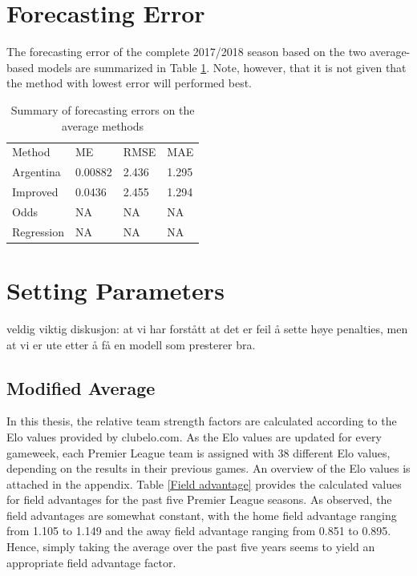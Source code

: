 \section{Forecasting Error}

The forecasting error of the complete 2017/2018 season based on the two average-based models are summarized in Table \ref{tab:accuracy_average}. Note, however, that it is not given that the method with lowest error will performed best. 

\begin{table}[H]
\centering
\caption{Summary of forecasting errors on the average methods}
\label{tab:accuracy_average}
\begin{tabular}{llll}
Method & ME & RMSE & MAE\\
Argentina & 0.00882 & 2.436 & 1.295 \\
Improved  & 0.0436  & 2.455 & 1.294 \\ 
Odds  & NA  & NA & NA   \\
Regression  & NA  & NA & NA \\
\end{tabular}
\end{table}

\section{Setting Parameters}
veldig viktig diskusjon: 
at vi har forstått at det er feil å sette høye penalties, men at vi er ute etter å få en modell som presterer bra. 


\subsection{Modified Average}
In this thesis, the relative team strength factors are calculated according to the Elo values provided by clubelo.com. As the Elo values are updated for every gameweek, each Premier League team is assigned with 38 different Elo values, depending on the results in their previous games. An overview of the Elo values is attached in the appendix. 
\newpar
Table \ref{Field advantage} provides the calculated values for field advantages for the past five Premier League seasons. As observed, the field advantages are somewhat constant, with the home field advantage ranging from 1.105 to 1.149 and the away field advantage ranging from 0.851 to 0.895. Hence, simply taking the average over the past five years seems to yield an appropriate field advantage factor. 

